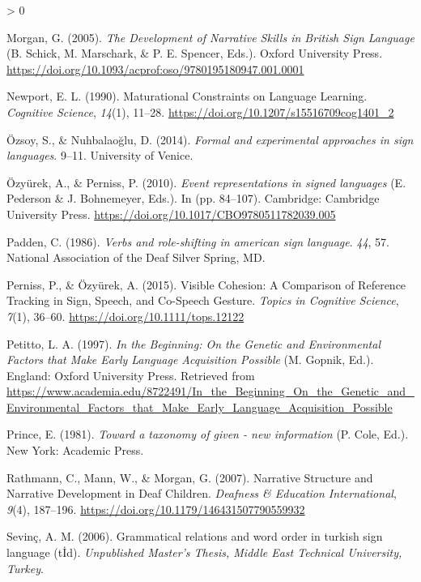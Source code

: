 \documentclass[
  english,
  doc,mask]{apa6}
\newlength{\cslhangindent}
\newenvironment{CSLReferences}[2] %
 {%
  \setlength{\parindent}{0pt}
  \ifodd #1 \everypar{\setlength{\hangindent}{\cslhangindent}}\ignorespaces\fi
  \ifnum #2 > 0
  \setlength{\parskip}{#2\baselineskip}
  \fi
 }%
 {}
\begin{document}
\begin{CSLReferences}{1}{0}
\leavevmode\hypertarget{ref-morgan2005}{}%
Morgan, G. (2005). \emph{The Development of Narrative Skills in British Sign Language} (B. Schick, M. Marschark, \& P. E. Spencer, Eds.). Oxford University Press. \url{https://doi.org/10.1093/acprof:oso/9780195180947.001.0001}

\leavevmode\hypertarget{ref-newport1990}{}%
Newport, E. L. (1990). Maturational Constraints on Language Learning. \emph{Cognitive Science}, \emph{14}(1), 11--28. \url{https://doi.org/10.1207/s15516709cog1401_2}

\leavevmode\hypertarget{ref-uxf6zsoy2014}{}%
Özsoy, S., \& Nuhbalaoğlu, D. (2014). \emph{Formal and experimental approaches in sign languages}. 9--11. University of Venice.

\leavevmode\hypertarget{ref-uxf6zyuxfcrek2010}{}%
Özyürek, A., \& Perniss, P. (2010). \emph{Event representations in signed languages} (E. Pederson \& J. Bohnemeyer, Eds.). In (pp. 84--107). Cambridge: Cambridge University Press. \url{https://doi.org/10.1017/CBO9780511782039.005}

\leavevmode\hypertarget{ref-padden1986}{}%
Padden, C. (1986). \emph{Verbs and role-shifting in american sign language}. \emph{44}, 57. National Association of the Deaf Silver Spring, MD.

\leavevmode\hypertarget{ref-perniss2015}{}%
Perniss, P., \& Özyürek, A. (2015). Visible Cohesion: A Comparison of Reference Tracking in Sign, Speech, and Co-Speech Gesture. \emph{Topics in Cognitive Science}, \emph{7}(1), 36--60. \url{https://doi.org/10.1111/tops.12122}

\leavevmode\hypertarget{ref-petitto1997}{}%
Petitto, L. A. (1997). \emph{In the Beginning: On the Genetic and Environmental Factors that Make Early Language Acquisition Possible} (M. Gopnik, Ed.). England: Oxford University Press. Retrieved from \url{https://www.academia.edu/8722491/In_the_Beginning_On_the_Genetic_and_Environmental_Factors_that_Make_Early_Language_Acquisition_Possible}

\leavevmode\hypertarget{ref-prince1981}{}%
Prince, E. (1981). \emph{Toward a taxonomy of given - new information} (P. Cole, Ed.). New York: Academic Press.

\leavevmode\hypertarget{ref-rathmann2007}{}%
Rathmann, C., Mann, W., \& Morgan, G. (2007). Narrative Structure and Narrative Development in Deaf Children. \emph{Deafness \& Education International}, \emph{9}(4), 187--196. \url{https://doi.org/10.1179/146431507790559932}

\leavevmode\hypertarget{ref-sevinuxe72006}{}%
Sevinç, A. M. (2006). Grammatical relations and word order in turkish sign language (t{İ}d). \emph{Unpublished Master's Thesis, Middle East Technical University, Turkey}.


\end{CSLReferences}
\end{document}
